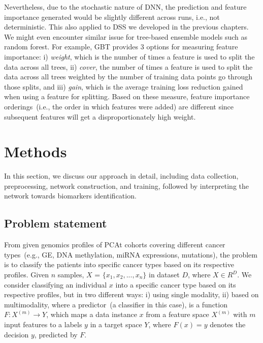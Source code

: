
\hspace*{3.5mm} Nevertheless, due to the stochastic nature of DNN, the prediction and feature importance generated would be slightly different across runs, i.e., not deterministic. This also applied to DSS we developed in the previous chapters. We might even encounter similar issue for tree-based ensemble models such as random forest. For example, GBT provides 3 options for measuring feature importance: i) \emph{weight}, which is the number of times a feature is used to split the data across all trees, ii) \emph{cover}, the number of times a feature is used to split the data across all trees weighted by the number of training data points go through those splits, and iii) \emph{gain}, which is the average training loss reduction gained when using a feature for splitting. Based on these measure, feature importance orderings~(i.e., the order in which features were added) are different since subsequent features will get a disproportionately high weight.

\section{Methods}\label{chapter_5:mm}
In this section, we discuss our approach in detail, including data collection, preprocessing, network construction, and training, followed by interpreting the network towards biomarkers identification. 

\subsection{Problem statement}
From given genomics profiles of PCAt cohorts covering  different cancer types~(e.g., GE, DNA methylation, miRNA expressions, mutations), the problem is to classify the patients into specific cancer types based on its respective profiles. Given $n$ samples, $X$ = ${{\{x_1,x_2, ..., x_n}}\}$ in dataset $D$, where $X \in {R}^{D}$. We consider classifying an individual $x$ into a specific cancer type based on its respective profiles, but in two different ways: i) using single modality, ii) based on multimodality, where a predictor~(a classifier in this case), is a function $F: {X}^{(m)} \rightarrow {Y}$, which maps a data instance $x$ from a feature space ${X}^{(m)}$ with $m$ input features to a labels $y$ in a target space ${Y}$, where $F(x)=y$ denotes the decision $y$, predicted by $F$. %

